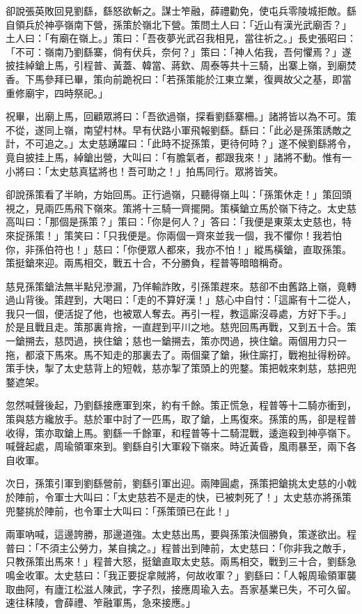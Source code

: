 卻說張英敗回見劉繇，繇怒欲斬之。謀士笮融，薛禮勸免，使屯兵零陵城拒敵。繇自領兵於神亭嶺南下營，孫策於嶺北下營。策問土人曰：「近山有漢光武廟否？」土人曰：「有廟在嶺上。」策曰：「吾夜夢光武召我相見，當往祈之。」長史張昭曰：「不可：嶺南乃劉繇寨，倘有伏兵，奈何？」策曰：「神人佑我，吾何懼焉？」遂披挂綽鎗上馬，引程普、黃蓋、韓當、蔣欽、周泰等共十三騎，出寨上嶺，到廟焚香。下馬參拜已畢，策向前跪祝曰：「若孫策能於江東立業，復興故父之基，即當重修廟宇，四時祭祀。」

祝畢，出廟上馬，回顧眾將曰：「吾欲過嶺，探看劉繇寨柵。」諸將皆以為不可。策不從，遂同上嶺，南望村林。早有伏路小軍飛報劉繇。繇曰：「此必是孫策誘敵之計，不可追之。」太史慈踴躍曰：「此時不捉孫策，更待何時？」遂不候劉繇將令，竟自披挂上馬，綽鎗出營，大叫曰：「有膽氣者，都跟我來！」諸將不動。惟有一小將曰：「太史慈真猛將也！吾可助之！」拍馬同行。眾將皆笑。

卻說孫策看了半晌，方始回馬。正行過嶺，只聽得嶺上叫：「孫策休走！」策回頭視之，見兩匹馬飛下嶺來。策將十三騎一齊擺開。策橫鎗立馬於嶺下待之。太史慈高叫曰：「那個是孫策？」策曰：「你是何人？」答曰：「我便是東萊太史慈也，特來捉孫策！」策笑曰：「只我便是。你兩個一齊來並我一個，我不懼你！我若怕你，非孫伯符也！」慈曰：「你便眾人都來，我亦不怕！」縱馬橫鎗，直取孫策。策挺鎗來迎。兩馬相交，戰五十合，不分勝負，程普等暗暗稱奇。

慈見孫策鎗法無半點兒滲漏，乃佯輸詐敗，引孫策趕來。慈卻不由舊路上嶺，竟轉過山背後。策趕到，大喝曰：「走的不算好漢！」慈心中自忖：「這廝有十二從人，我只一個，便活捉了他，也被眾人奪去。再引一程，教這廝沒尋處，方好下手。」於是且戰且走。策那裏肯捨，一直趕到平川之地。慈兜回馬再戰，又到五十合。策一鎗搠去，慈閃過，挾住鎗；慈也一鎗搠去，策亦閃過，挾住鎗。兩個用力只一拖，都滾下馬來。馬不知走的那裏去了。兩個棄了鎗，揪住廝打，戰袍扯得粉碎。策手快，掣了太史慈背上的短戟，慈亦掣了策頭上的兜鍪。策把戟來刺慈，慈把兜鍪遮架。

忽然喊聲後起，乃劉繇接應軍到來，約有千餘。策正慌急，程普等十二騎亦衝到，策與慈方纔放手。慈於軍中討了一匹馬，取了鎗，上馬復來。孫策的馬，卻是程普收得，策亦取鎗上馬。劉繇一千餘軍，和程普等十二騎混戰，逶迤殺到神亭嶺下。喊聲起處，周瑜領軍來到。劉繇自引大軍殺下嶺來。時近黃昏，風雨暴至，兩下各自收軍。

次日，孫策引軍到劉繇營前，劉繇引軍出迎。兩陣圓處，孫策把鎗挑太史慈的小戟於陣前，令軍士大叫曰：「太史慈若不是走的快，已被刺死了！」太史慈亦將孫策兜鍪挑於陣前，也令軍士大叫曰：「孫策頭已在此！」

兩軍吶喊，這邊誇勝，那邊道強。太史慈出馬，要與孫策決個勝負，策遂欲出。程普曰：「不須主公勞力，某自擒之。」程普出到陣前，太史慈曰：「你非我之敵手，只教孫策出馬來！」程普大怒，挺鎗直取太史慈。兩馬相交，戰到三十合，劉繇急鳴金收軍。太史慈曰：「我正要捉拿賊將，何故收軍？」劉繇曰：「人報周瑜領軍襲取曲阿，有廬江松滋人陳武，字子烈，接應周瑜入去。吾家基業已失，不可久留。速往秣陵，會薛禮、笮融軍馬，急來接應。」

